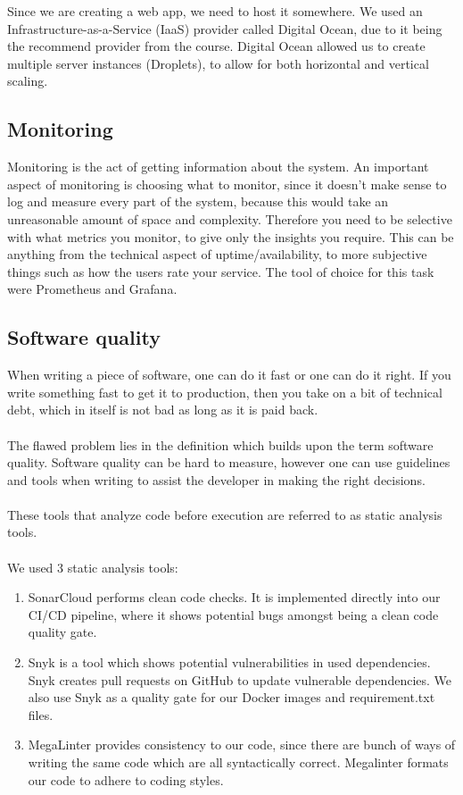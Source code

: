 Since we are creating a web app, we need to host it somewhere. We used an Infrastructure-as-a-Service (IaaS) provider called Digital Ocean, due to it being the recommend provider from the course. Digital Ocean allowed us to create multiple server instances (Droplets), to allow for both horizontal and vertical scaling.

\subsection*{Monitoring}

Monitoring is the act of getting information about the system. An important aspect of monitoring is choosing what to monitor, since it doesn't make sense to log and measure every part of the system, because this would take an unreasonable amount of space and complexity. Therefore you need to be selective with what metrics you monitor, to give only the insights you require. This can be anything from the technical aspect of uptime/availability, to more subjective things such as how the users rate your service. The tool of choice for this task were Prometheus and Grafana.

\subsection*{Software quality}

When writing a piece of software, one can do it fast or one can do it right. If you write something fast to get it to production, then you take on a bit of technical debt, which in itself is not bad as long as it is paid back.
\\\\
The flawed problem lies in the definition which builds upon the term software quality. Software quality can be hard to measure, however one can use guidelines and tools when writing to assist the developer in making the right decisions.
\\\\
These tools that analyze code before execution are referred to as static analysis tools.
\\\\
We used 3 static analysis tools:
\begin{enumerate}
    \item SonarCloud performs clean code checks. It is implemented directly into our CI/CD pipeline, where it shows potential bugs amongst being a clean code quality gate.
    \item Snyk is a tool which shows potential vulnerabilities in used dependencies. Snyk creates pull requests on GitHub to update vulnerable dependencies. We also use Snyk as a quality gate for our Docker images and requirement.txt files.
    \item MegaLinter provides consistency to our code, since there are bunch of ways of writing the same code which are all syntactically correct. Megalinter formats our code to adhere to coding styles.
\end{enumerate}

